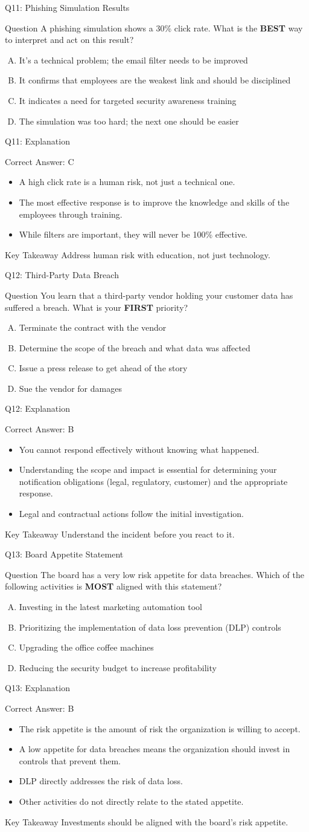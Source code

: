 \documentclass[aspectratio=169]{beamer}
\newcommand{\hq}[7]{%
	\begin{frame}{Q#1: #2}
		\begin{block}{Question}
			#3
		\end{block}
		\begin{enumerate}[(A)]
			#4
		\end{enumerate}
	\end{frame}
	\begin{frame}{Q#1: Explanation}
		\begin{block}{Correct Answer: #5}
			\begin{itemize}
				#6
			\end{itemize}
		\end{block}
		\begin{alertblock}{Key Takeaway}
			#7
		\end{alertblock}
	\end{frame}
}
\begin{document}
	\hq{11}{Phishing Simulation Results}
	{A phishing simulation shows a 30\% click rate. What is the \textbf{BEST} way to interpret and act on this result?}
	{\item It's a technical problem; the email filter needs to be improved
		\item It confirms that employees are the weakest link and should be disciplined
		\item It indicates a need for targeted security awareness training
		\item The simulation was too hard; the next one should be easier}
	{C}
	{\item A high click rate is a human risk, not just a technical one.
		\item The most effective response is to improve the knowledge and skills of the employees through training.
		\item While filters are important, they will never be 100\% effective.}
	{Address human risk with education, not just technology.}
	
	\hq{12}{Third-Party Data Breach}
	{You learn that a third-party vendor holding your customer data has suffered a breach. What is your \textbf{FIRST} priority?}
	{\item Terminate the contract with the vendor
		\item Determine the scope of the breach and what data was affected
		\item Issue a press release to get ahead of the story
		\item Sue the vendor for damages}
	{B}
	{\item You cannot respond effectively without knowing what happened.
		\item Understanding the scope and impact is essential for determining your notification obligations (legal, regulatory, customer) and the appropriate response.
		\item Legal and contractual actions follow the initial investigation.}
	{Understand the incident before you react to it.}
	
	\hq{13}{Board Appetite Statement}
	{The board has a very low risk appetite for data breaches. Which of the following activities is \textbf{MOST} aligned with this statement?}
	{\item Investing in the latest marketing automation tool
		\item Prioritizing the implementation of data loss prevention (DLP) controls
		\item Upgrading the office coffee machines
		\item Reducing the security budget to increase profitability}
	{B}
	{\item The risk appetite is the amount of risk the organization is willing to accept.
		\item A low appetite for data breaches means the organization should invest in controls that prevent them.
		\item DLP directly addresses the risk of data loss.
		\item Other activities do not directly relate to the stated appetite.}
	{Investments should be aligned with the board's risk appetite.}
	
\end{document}
